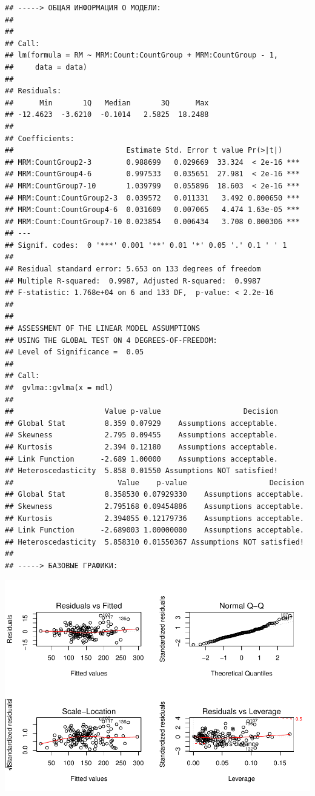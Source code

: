 \documentclass[
]{article}
\begin{document}
\begin{verbatim}
## -----> ОБЩАЯ ИНФОРМАЦИЯ О МОДЕЛИ:
## 
## 
## Call:
## lm(formula = RM ~ MRM:Count:CountGroup + MRM:CountGroup - 1, 
##     data = data)
## 
## Residuals:
##      Min       1Q   Median       3Q      Max 
## -12.4623  -3.6210  -0.1014   2.5825  18.2488 
## 
## Coefficients:
##                          Estimate Std. Error t value Pr(>|t|)    
## MRM:CountGroup2-3        0.988699   0.029669  33.324  < 2e-16 ***
## MRM:CountGroup4-6        0.997533   0.035651  27.981  < 2e-16 ***
## MRM:CountGroup7-10       1.039799   0.055896  18.603  < 2e-16 ***
## MRM:Count:CountGroup2-3  0.039572   0.011331   3.492 0.000650 ***
## MRM:Count:CountGroup4-6  0.031609   0.007065   4.474 1.63e-05 ***
## MRM:Count:CountGroup7-10 0.023854   0.006434   3.708 0.000306 ***
## ---
## Signif. codes:  0 '***' 0.001 '**' 0.01 '*' 0.05 '.' 0.1 ' ' 1
## 
## Residual standard error: 5.653 on 133 degrees of freedom
## Multiple R-squared:  0.9987, Adjusted R-squared:  0.9987 
## F-statistic: 1.768e+04 on 6 and 133 DF,  p-value: < 2.2e-16
## 
## 
## ASSESSMENT OF THE LINEAR MODEL ASSUMPTIONS
## USING THE GLOBAL TEST ON 4 DEGREES-OF-FREEDOM:
## Level of Significance =  0.05 
## 
## Call:
##  gvlma::gvlma(x = mdl) 
## 
##                     Value p-value                   Decision
## Global Stat         8.359 0.07929    Assumptions acceptable.
## Skewness            2.795 0.09455    Assumptions acceptable.
## Kurtosis            2.394 0.12180    Assumptions acceptable.
## Link Function      -2.689 1.00000    Assumptions acceptable.
## Heteroscedasticity  5.858 0.01550 Assumptions NOT satisfied!
##                        Value    p-value                   Decision
## Global Stat         8.358530 0.07929330    Assumptions acceptable.
## Skewness            2.795168 0.09454886    Assumptions acceptable.
## Kurtosis            2.394055 0.12179736    Assumptions acceptable.
## Link Function      -2.689003 1.00000000    Assumptions acceptable.
## Heteroscedasticity  5.858310 0.01550367 Assumptions NOT satisfied!
## 
## -----> БАЗОВЫЕ ГРАФИКИ:
\end{verbatim}

\begin{center}\includegraphics{Regression-model-for-estimating-RM_files/figure-latex/unnamed-chunk-33-4} \end{center}
\end{document}

